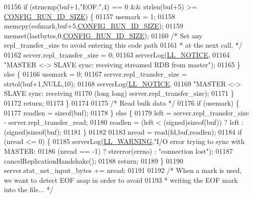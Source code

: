 \begin{DoxyCode}
{{{{{{{{{{{{{{{{{{{{{{{{{{{{{{{{{{{{{{{{{{{01156         \textcolor{keywordflow}{if} (strncmp(buf+1,\textcolor{stringliteral}{"EOF:"},4) == 0 && strlen(buf+5) >= 
      \hyperlink{server_8h_aba6794fa3ee28f85165eaed93190f1df}{CONFIG\_RUN\_ID\_SIZE}) \{
01157             usemark = 1;
01158             memcpy(eofmark,buf+5,\hyperlink{server_8h_aba6794fa3ee28f85165eaed93190f1df}{CONFIG\_RUN\_ID\_SIZE});
01159             memset(lastbytes,0,\hyperlink{server_8h_aba6794fa3ee28f85165eaed93190f1df}{CONFIG\_RUN\_ID\_SIZE});
01160             \textcolor{comment}{/* Set any repl\_transfer\_size to avoid entering this code path}
01161 \textcolor{comment}{             * at the next call. */}
01162             server.repl\_transfer\_size = 0;
01163             serverLog(\hyperlink{server_8h_a8c54c191e436c7dd3012167212692401}{LL\_NOTICE},
01164                 \textcolor{stringliteral}{"MASTER <-> SLAVE sync: receiving streamed RDB from master"});
01165         \} \textcolor{keywordflow}{else} \{
01166             usemark = 0;
01167             server.repl\_transfer\_size = strtol(buf+1,NULL,10);
01168             serverLog(\hyperlink{server_8h_a8c54c191e436c7dd3012167212692401}{LL\_NOTICE},
01169                 \textcolor{stringliteral}{"MASTER <-> SLAVE sync: receiving %
01170                 (\textcolor{keywordtype}{long} \textcolor{keywordtype}{long}) server.repl\_transfer\_size);
01171         \}
01172         \textcolor{keywordflow}{return};
01173     \}
01174 
01175     \textcolor{comment}{/* Read bulk data */}
01176     \textcolor{keywordflow}{if} (usemark) \{
01177         readlen = \textcolor{keyword}{sizeof}(buf);
01178     \} \textcolor{keywordflow}{else} \{
01179         left = server.repl\_transfer\_size - server.repl\_transfer\_read;
01180         readlen = (left < (\textcolor{keywordtype}{signed})\textcolor{keyword}{sizeof}(buf)) ? left : (\textcolor{keywordtype}{signed})\textcolor{keyword}{sizeof}(buf);
01181     \}
01182 
01183     nread = read(fd,buf,readlen);
01184     \textcolor{keywordflow}{if} (nread <= 0) \{
01185         serverLog(\hyperlink{server_8h_a31229b9334bba7d6be2a72970967a14b}{LL\_WARNING},\textcolor{stringliteral}{"I/O error trying to sync with MASTER: %
01186             (nread == -1) ? strerror(errno) : \textcolor{stringliteral}{"connection lost"});
01187         cancelReplicationHandshake();
01188         \textcolor{keywordflow}{return};
01189     \}
01190     server.stat\_net\_input\_bytes += nread;
01191 
01192     \textcolor{comment}{/* When a mark is used, we want to detect EOF asap in order to avoid}
01193 \textcolor{comment}{     * writing the EOF mark into the file... */}
}}}}}}}}}}}}}}}}}}}}}}}}}}}}}}}}}}}}}}}}}}}}}
\end{DoxyCode}
